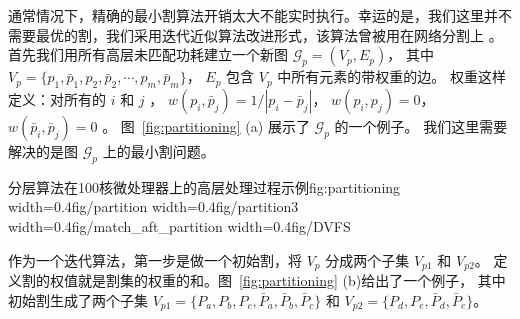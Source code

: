 通常情况下，精确的最小割算法开销太大不能实时执行。幸运的是，我们这里并不需要最优的割，我们采用迭代近似算法改进形式，该算法曾被用在网络分割上 \cite{Fidducia:DAC'82} 。
首先我们用所有高层未匹配功耗建立一个新图 $\mathcal{G}_p = (V_p, E_p)$，
其中 $V_p=\{p_1, \bar{p}_1, p_2, \bar{p}_2, \cdots, p_m, \bar{p}_m\}$， 
$E_p$ 包含 $V_p$ 中所有元素的带权重的边。
权重这样定义：对所有的 $i$ 和 $j$ ，  $w(p_i, \bar{p}_j) = 1/|p_i-\bar{p}_j|$，
$w(p_i, p_j) = 0$， $w(\bar{p}_i, \bar{p}_j) = 0$  。
图~\ref{fig:partitioning} (a) 展示了 $\mathcal{G}_p$ 的一个例子。 
我们这里需要解决的是图 $\mathcal{G}_p$ 上的最小割问题。 

\begin{pics}{分层算法在100核微处理器上的高层处理过程示例}{fig:partitioning}
  \centering
  {width=0.4\columnwidth}{fig/partition}
  {width=0.4\columnwidth}{fig/partition3}
  {width=0.4\columnwidth}{fig/match_aft_partition}
  {width=0.4\columnwidth}{fig/DVFS}
\end{pics}

作为一个迭代算法，第一步是做一个初始割，将 $V_p$ 分成两个子集 $V_{p1}$ 和 $V_{p2}$。
定义割的权值就是割集的权重的和。图~\ref{fig:partitioning} (b)给出了一个例子，
其中初始割生成了两个子集 $V_{p1}=\{P_a, P_b, P_c, \bar{P}_a,
  \bar{P}_b, \bar{P}_c\}$ 和 $V_{p2}=\{P_d, P_e, \bar{P}_d,
  \bar{P}_e\}$。
  
